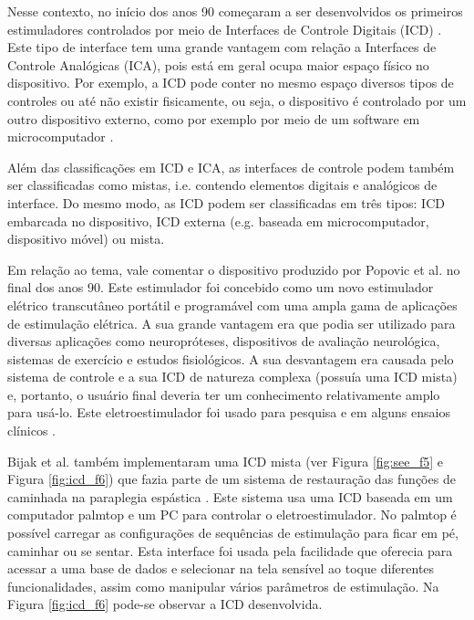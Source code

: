 Nesse contexto, no início dos anos 90 começaram a ser desenvolvidos os primeiros estimuladores controlados por meio de Interfaces de Controle Digitais (\acrshort{ICD}) \cite{Kaczmarek1991ASystem}. Este tipo de interface tem uma grande vantagem com relação a Interfaces de Controle Analógicas (\acrshort{ICA}), pois está em geral ocupa maior espaço físico no dispositivo. Por exemplo, a \acrshort{ICD} pode conter no mesmo espaço diversos tipos de controles ou até não existir fisicamente, ou seja, o dispositivo é controlado por um outro dispositivo externo, como por exemplo por meio de um software em microcomputador \cite{Wu2002AApplications, Bijak2002TheParaplegia}. 

Além das classificações em \acrshort{ICD} e \acrshort{ICA}, as interfaces de controle podem também ser classificadas como mistas, i.e. contendo elementos digitais e analógicos de interface. Do mesmo modo, as \acrshort{ICD} podem ser classificadas em três tipos: \acrshort{ICD} embarcada no dispositivo, \acrshort{ICD} externa (e.g. baseada em microcomputador, dispositivo móvel) ou mista.

Em relação ao tema, vale comentar o dispositivo produzido por Popovic et al. no final dos anos 90. Este estimulador foi concebido como um novo estimulador elétrico transcutâneo portátil e programável com uma ampla gama de aplicações de estimulação elétrica. A sua grande vantagem era que podia ser utilizado para diversas aplicações como neuropróteses, dispositivos de avaliação neurológica, sistemas de exercício e estudos fisiológicos. A sua desvantagem era causada pelo sistema de controle e a sua \acrshort{ICD} de natureza complexa (possuía uma \acrshort{ICD} mista) e, portanto, o usuário final deveria ter um conhecimento relativamente amplo para usá-lo. Este eletroestimulador foi usado para pesquisa e em alguns ensaios clínicos \cite{Popovic2001CompexApplications, Popovic2005ModularSystem}.

Bijak et al. também implementaram uma \acrshort{ICD} mista (ver Figura \ref{fig:see_f5} e Figura \ref{fig:icd_f6}) que fazia parte de um sistema de restauração das funções de caminhada na paraplegia espástica \cite{Bijak2002TheParaplegia}. Este sistema usa uma \acrshort{ICD} baseada em um computador palmtop e um PC para controlar o eletroestimulador. No palmtop é possível carregar as configurações de sequências de estimulação para ficar em pé, caminhar ou se sentar. Esta interface foi usada pela facilidade que oferecia para acessar a uma base de dados e selecionar na tela sensível ao toque diferentes funcionalidades, assim como manipular vários parâmetros de estimulação. Na Figura \ref{fig:icd_f6} pode-se observar a \acrshort{ICD} desenvolvida.

